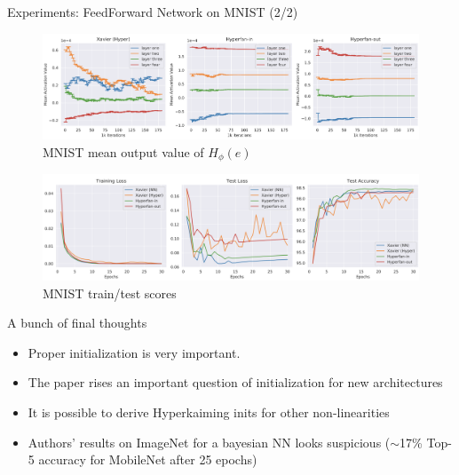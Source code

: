 \documentclass[handout, 10pt]{beamer}
\begin{document}
\begin{frame}{Experiments: FeedForward Network on MNIST (2/2)}
\begin{figure}
    \centering
    \includegraphics[width=\textwidth]{images/mnist-hypernet-mean-output.png}
    \caption{MNIST mean output value of $H_\phi(e)$}
\end{figure}

\begin{figure}
    \centering
    \includegraphics[width=\textwidth]{images/mnist-scores.png}
    \caption{MNIST train/test scores}
\end{figure}
\end{frame}


\begin{frame}{A bunch of final thoughts}
    \begin{itemize}
        \item Proper initialization is very important.
        \item The paper rises an important question of initialization for new architectures
        \item It is possible to derive Hyperkaiming inits for other non-linearities
        \item Authors' results on ImageNet for a bayesian NN looks suspicious ($\sim$17\% Top-5 accuracy for MobileNet after 25 epochs) 
    \end{itemize}
\end{frame}
\end{document}
